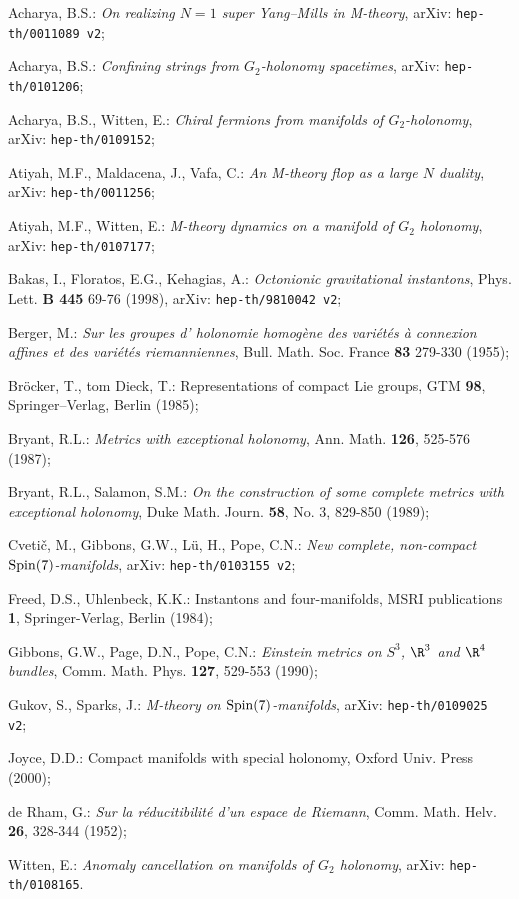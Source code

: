 \documentclass[a4paper,12pt,draft]{article}
\begin{document}
\begin{thebibliography}{99}

 Acharya, B.S.: {\it On realizing $N=1$ super Yang--Mills in
M-theory}, arXiv: {\tt hep-th/0011089 v2};

 Acharya, B.S.: {\it Confining strings from $G_2$-holonomy
spacetimes}, arXiv: {\tt hep-th/0101206};

 Acharya, B.S., Witten, E.: {\it Chiral fermions from
manifolds of $G_2$-holonomy}, arXiv: {\tt hep-th/0109152};

 Atiyah, M.F., Maldacena, J., Vafa, C.: {\it An
M-theory flop as a large $N$ duality}, arXiv: {\tt hep-th/0011256};

 Atiyah, M.F., Witten, E.: {\it M-theory dynamics on a
manifold of $G_2$ holonomy}, arXiv: {\tt hep-th/0107177};

 Bakas, I., Floratos, E.G., Kehagias, A.: {\it
Octonionic gravitational instantons}, Phys. Lett. {\bf B 445} 69-76
(1998), arXiv: {\tt hep-th/9810042 v2};

 Berger, M.: {\it Sur les groupes d' holonomie homog\`ene des
vari\'et\'es \`a connexion affines et des vari\'et\'es riemanniennes},
Bull. Math. Soc. France {\bf 83} 279-330 (1955);

 Br\"ocker, T., tom Dieck, T.: Representations of compact
Lie groups, GTM {\bf 98}, Springer--Verlag, Berlin (1985);
 
 Bryant, R.L.: {\it Metrics with exceptional holonomy},
Ann. Math. {\bf 126}, 525-576 (1987);

 Bryant, R.L., Salamon, S.M.: {\it On the construction
of some complete metrics with exceptional holonomy}, Duke
Math. Journ. {\bf 58}, No. 3, 829-850 (1989);

 Cveti\v c, M., Gibbons, G.W., L\"u, H., Pope,
C.N.: {\it New complete, non-compact ${\rm Spin}(7)$-manifolds},
arXiv: {\tt hep-th/0103155 v2};
 
 Freed, D.S., Uhlenbeck, K.K.: Instantons and
four-manifolds, MSRI publications {\bf 1}, Springer-Verlag, Berlin (1984);

 Gibbons, G.W., Page, D.N., Pope, C.N.: {\it Einstein
metrics on $S^3$, $\R^3$ and $\R^4$ bundles}, Comm. Math. Phys. {\bf 127}, 
529-553 (1990);

 Gukov, S., Sparks, J.: {\it M-theory on ${\rm
Spin}(7)$-manifolds}, arXiv: {\tt hep-th/0109025 v2};

 Joyce, D.D.: Compact manifolds with special holonomy, Oxford
Univ. Press (2000);

 de Rham, G.: {\it Sur la r\'educitibilit\'e d'un espace de
Riemann}, Comm. Math. Helv. {\bf 26}, 328-344 (1952);

 Witten, E.: {\it Anomaly cancellation on manifolds of $G_2$
holonomy}, arXiv: {\tt hep-th/0108165}.

\end{thebibliography} 
\end{document}
